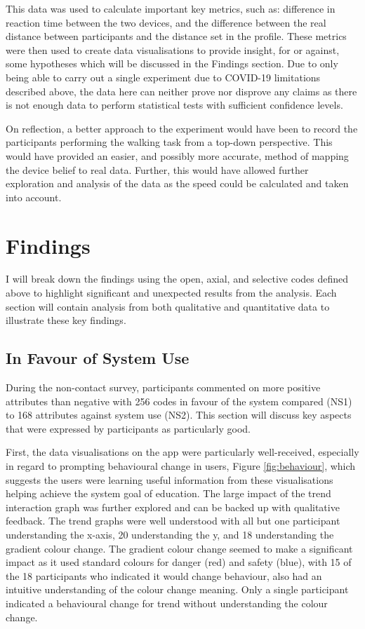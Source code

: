 \documentclass{l4proj}
\begin{document}
This data was used to calculate important key metrics, such as: difference in reaction time between the two devices, and the difference between the real distance between participants and the distance set in the profile. These metrics were then used to create data visualisations to provide insight, for or against, some hypotheses which will be discussed in the Findings section. Due to only being able to carry out a single experiment due to COVID-19 limitations described above, the data here can neither prove nor disprove any claims as there is not enough data to perform statistical tests with sufficient confidence levels.

On reflection, a better approach to the experiment would have been to record the participants performing the walking task from a top-down perspective. This would have provided an easier, and possibly more accurate, method of mapping the device belief to real data. Further, this would have allowed further exploration and analysis of the data as the speed could be calculated and taken into account.

\section{Findings}

I will break down the findings using the open, axial, and selective codes defined above to highlight significant and unexpected results from the analysis. Each section will contain analysis from both qualitative and quantitative data to illustrate these key findings.

\subsection{In Favour of System Use}

During the non-contact survey, participants commented on more positive attributes than negative with 256 codes in favour of the system compared (NS1) to 168 attributes against system use (NS2). This section will discuss key aspects that were expressed by participants as particularly good.

First, the data visualisations on the app were particularly well-received, especially in regard to prompting behavioural change in users, Figure \ref{fig:behaviour}, which suggests the users were learning useful information from these visualisations helping achieve the system goal of education. The large impact of the trend interaction graph was further explored and can be backed up with qualitative feedback. The trend graphs were well understood with all but one participant understanding the x-axis, 20 understanding the y, and 18 understanding the gradient colour change. The gradient colour change seemed to make a significant impact as it used standard colours for danger (red) and safety (blue), with 15 of the 18 participants who indicated it would change behaviour, also had an intuitive understanding of the colour change meaning. Only a single participant indicated a behavioural change for trend without understanding the colour change.
\end{document}
